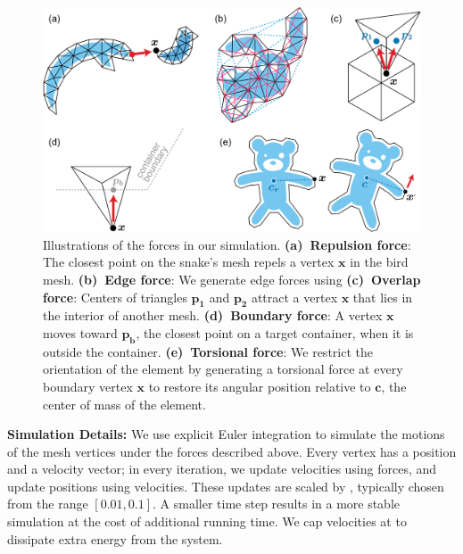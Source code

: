 \begin{figure}
\centering
\includegraphics[width=1.0\textwidth]{figures/repulsionpak/all_forces_new.pdf}
\vspace{10pt}
\caption[Illustrations of the forces in a RepulsionPak simulation]{
\label{fig_forces}
Illustrations of the forces in our simulation.
\;\textbf{(a)~Repulsion force}:
The closest point on the snake's mesh
repels a vertex $\bm{x}$ in the bird mesh.
\textbf{(b)~Edge force}: 
We generate edge forces using
\textbf{(c)~Overlap force}: 
Centers of triangles $\bm{p_1}$ and $\bm{p_2}$ attract a vertex
$\bm{x}$ that lies in the interior of another mesh.
\;\textbf{(d)~Boundary force}: A vertex $\bm{x}$ moves toward $\bm{p_b}$,
the closest point on a target container, when it is outside the container.
\textbf{(e)~Torsional force}: We restrict the orientation of the element by generating 
a torsional force at every boundary vertex $\bm{x}$
to restore its angular position relative to $\bm{c}$, 
the center of mass of the element.
}
\end{figure}


\medskip
\textbf{Simulation Details:} 
We use explicit Euler integration to simulate the motions of the mesh vertices under the
forces described above.  Every vertex has a position and a velocity vector; in
every iteration, we update velocities using forces, and update positions using
velocities.  These updates are scaled by , typically
chosen from the range $[0.01,0.1]$.  A smaller time step results in a more
stable simulation at the cost of additional running time.  We cap velocities
at  to dissipate extra energy from the system.

